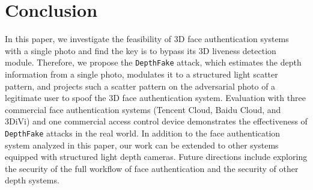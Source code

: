 \section{Conclusion}

In this paper, we investigate the feasibility of 3D face authentication systems with a single photo and find the key is to bypass its 3D liveness detection module.
Therefore, we propose the \texttt{DepthFake} attack, which estimates the depth information from a single photo, modulates it to a structured light scatter pattern, and projects such a scatter pattern  on the adversarial photo of a legitimate user to spoof the 3D face authentication system.
Evaluation with three commercial face authentication systems (Tencent Cloud, Baidu Cloud, and 3DiVi) and one commercial access control device demonstrates the effectiveness of \texttt{DepthFake}  attacks in the real world. In addition to the face authentication system analyzed in this paper, our work can be extended to other systems equipped with structured light depth cameras. Future directions include exploring the security of the full workflow of face authentication and the security of other depth systems.